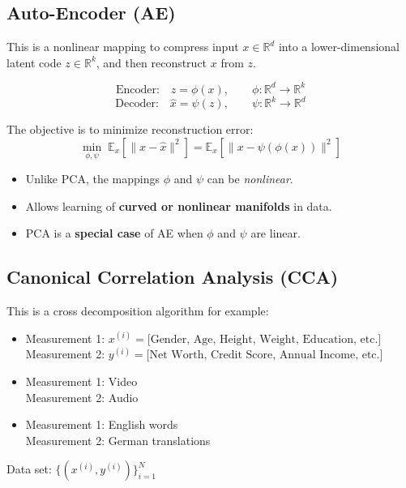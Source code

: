 \documentclass[11pt]{article}
\begin{document}
\subsection*{Auto-Encoder (AE)}

This is a nonlinear mapping to compress input $x \in \mathbb{R}^d$ into 
a lower-dimensional latent code $z \in \mathbb{R}^k$, and then reconstruct $x$ from $z$.

\[
\text{Encoder:} \quad z = \phi(x), \qquad \phi: \mathbb{R}^d \rightarrow \mathbb{R}^k
\]
\[
\text{Decoder:} \quad \hat{x} = \psi(z), \qquad \psi: \mathbb{R}^k \rightarrow \mathbb{R}^d
\]

The objective is to minimize reconstruction error:
\[
\min_{\phi,\psi} \; \mathbb{E}_{x} \left[ \|x - \hat{x}\|^2 \right] 
= \mathbb{E}_{x} \left[ \|x - \psi(\phi(x))\|^2 \right]
\]


\begin{itemize}
    \item Unlike PCA, the mappings $\phi$ and $\psi$ can be \textit{nonlinear}.
    \item Allows learning of \textbf{curved or nonlinear manifolds} in data.
    \item PCA is a \textbf{special case} of AE when $\phi$ and $\psi$ are linear.
\end{itemize}



\subsection{Canonical Correlation Analysis (CCA)}
This is a cross decomposition algorithm for example:

\medskip

\begin{itemize}
    \item Measurement 1: $x^{(i)} = \text{[Gender, Age, Height, Weight, Education, etc.]}$ \\ Measurement 2: $y^{(i)} = \text{[Net Worth, Credit Score, Annual Income, etc.]}$
    \item Measurement 1: Video \\ Measurement 2: Audio
    \item Measurement 1: English words \\ Measurement 2: German translations
\end{itemize}

Data set: \(\{(x^{(i)}, y^{(i)})\}_{i=1}^N\)

\medskip
\end{document}
